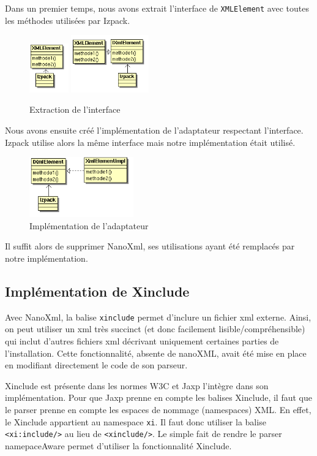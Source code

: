 Dans un premier temps, nous avons extrait l'interface de \verb|XMLElement| avec toutes les méthodes utilisées par Izpack.
\begin{figure}[H]
	\centering
	\includegraphics[width=0.15\textwidth]{../image/sol_casInitial.png}
	\hfil
	\includegraphics[width=0.3\textwidth]{../image/sol_extractionInterface.png}
	\caption{Extraction de l'interface}
\end{figure}
Nous avons ensuite créé l'implémentation de l'adaptateur respectant l'interface.
Izpack utilise alors la même interface mais notre implémentation était utilisé.
\begin{figure}[H]
	\centering
	\includegraphics[width=0.4\textwidth]{../image/sol_implementation.png}
	\caption{Implémentation de l'adaptateur}
\end{figure}
Il suffit alors de supprimer NanoXml, ses utilisations ayant été remplacés par notre implémentation.
\subsection{Implémentation de Xinclude}
Avec NanoXml, la balise \verb|xinclude| permet d'inclure un fichier xml externe.
Ainsi, on peut utiliser un xml très succinct (et donc facilement lisible/compréhensible) qui inclut d'autres fichiers xml décrivant uniquement certaines parties de l'installation.
Cette fonctionnalité, absente de nanoXML, avait été mise en place en modifiant directement le code de son parseur.

Xinclude est présente dans les normes W3C et Jaxp l'intègre dans son implémentation.
Pour que Jaxp prenne en compte les balises Xinclude, il faut que le parser prenne en compte les espaces de nommage (namespaces) XML.
En effet, le Xinclude appartient au namespace \verb|xi|.
Il faut donc utiliser la balise \verb|<xi:include/>| au lieu de \verb|<xinclude/>|.
Le simple fait de rendre le parser namepaceAware permet d'utiliser la fonctionnalité Xinclude.
